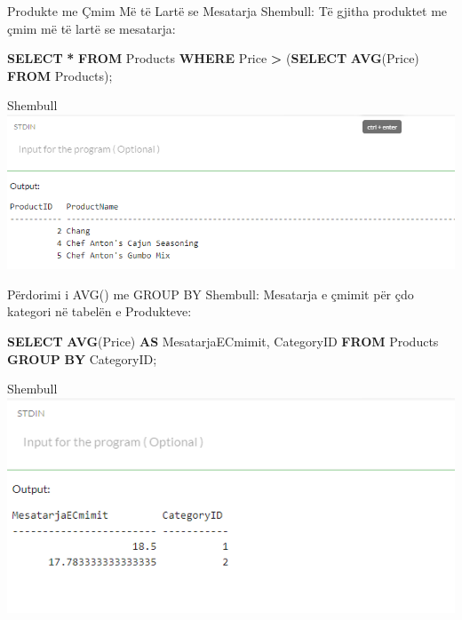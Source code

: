 \documentclass[
  ignorenonframetext,
]{beamer}
\newenvironment{Shaded}{\begin{snugshade}}{\end{snugshade}}
\newcommand{\FunctionTok}[1]{\textcolor[rgb]{0.13,0.29,0.53}{\textbf{#1}}}
\newcommand{\KeywordTok}[1]{\textcolor[rgb]{0.13,0.29,0.53}{\textbf{#1}}}
\newcommand{\NormalTok}[1]{#1}
\newcommand{\OperatorTok}[1]{\textcolor[rgb]{0.81,0.36,0.00}{\textbf{#1}}}
\begin{document}
\begin{frame}[fragile]{Produkte me Çmim Më të Lartë se Mesatarja}
\label{produkte-me-uxe7mim-muxeb-tuxeb-lartuxeb-se-mesatarja}
Shembull: Të gjitha produktet me çmim më të lartë se mesatarja:


\begin{Shaded}
\begin{Highlighting}[]
\KeywordTok{SELECT} \OperatorTok{*}
\KeywordTok{FROM}\NormalTok{ Products}
\KeywordTok{WHERE}\NormalTok{ Price }\OperatorTok{\textgreater{}}\NormalTok{ (}\KeywordTok{SELECT} \FunctionTok{AVG}\NormalTok{(Price) }\KeywordTok{FROM}\NormalTok{ Products);}
\end{Highlighting}
\end{Shaded}
\end{frame}

\begin{frame}{Shembull}
\label{shembull-2}
\includegraphics{./Figs/query59.png}
\end{frame}

\begin{frame}[fragile]{Përdorimi i AVG() me GROUP BY}
\label{puxebrdorimi-i-avg-me-group-by}
Shembull: Mesatarja e çmimit për çdo kategori në tabelën e Produkteve:


\begin{Shaded}
\begin{Highlighting}[]
\KeywordTok{SELECT} \FunctionTok{AVG}\NormalTok{(Price) }\KeywordTok{AS}\NormalTok{ MesatarjaECmimit, CategoryID}
\KeywordTok{FROM}\NormalTok{ Products}
\KeywordTok{GROUP} \KeywordTok{BY}\NormalTok{ CategoryID;}
\end{Highlighting}
\end{Shaded}
\end{frame}

\begin{frame}{Shembull}
\label{shembull-3}
\includegraphics{./Figs/query60.png}
\end{frame}
\end{document}
